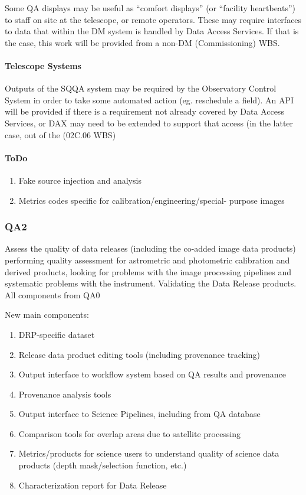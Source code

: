 Some QA displays may be useful as ``comfort displays'' (or ``facility heartbeats'') to staff on site at the telescope, or remote operators. These may require interfaces to data that within the DM system is handled by Data Access Services. If that is the case, this work will be provided from a non-DM (Commissioning) WBS.

\paragraph{Telescope Systems}
\label{sec:qaTelescopeSystem}

Outputs of the SQQA system may be required by the Observatory Control
System in order to take some automated action (eg. reschedule a
field). An API will be provided if there is a requirement not already
covered by Data Access Services, or DAX may need to be extended to support that access (in the latter case, out of the (02C.06 WBS)

\paragraph{ToDo}

\begin{enumerate}

\item Fake source injection and analysis


\item Metrics codes specific for calibration/engineering/special- purpose images
\end{enumerate}

\subsubsection{QA2}
Assess the quality of data releases (including the co-added image data products) performing quality assessment for astrometric and photometric calibration and derived products, looking for problems with the image processing pipelines and systematic problems with the instrument.
Validating the Data Release products.
All components from QA0

New main components:
\begin{enumerate}
\item DRP-specific dataset
\item Release data product editing tools (including provenance tracking)
\item Output interface to workflow system based on QA results and provenance
\item Provenance analysis tools
\item Output interface to Science Pipelines, including from QA database
\item Comparison tools for overlap areas due to satellite processing
\item Metrics/products for science users to understand quality of science data products (depth mask/selection function, etc.)
\item Characterization report for Data Release
\end{enumerate}

